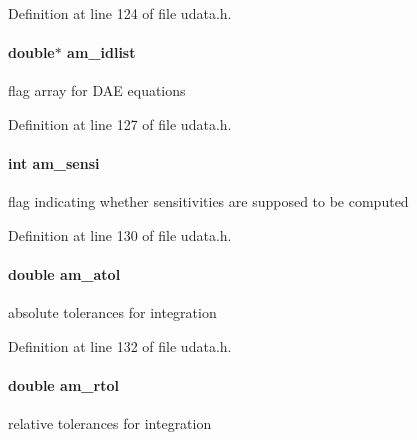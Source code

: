 Definition at line 124 of file udata.\+h.

\hypertarget{struct_user_data_ab62bd78b1593ddbf3d854356b4dcaa0f}{}
\paragraph[{am\+\_\+idlist}]{\setlength{\rightskip}{0pt plus 5cm}double$\ast$ am\+\_\+idlist}\label{struct_user_data_ab62bd78b1593ddbf3d854356b4dcaa0f}
flag array for D\+A\+E equations 

Definition at line 127 of file udata.\+h.

\hypertarget{struct_user_data_a3bd631d595b8a864de83f25a1756ce3d}{}
\paragraph[{am\+\_\+sensi}]{\setlength{\rightskip}{0pt plus 5cm}int am\+\_\+sensi}\label{struct_user_data_a3bd631d595b8a864de83f25a1756ce3d}
flag indicating whether sensitivities are supposed to be computed 

Definition at line 130 of file udata.\+h.

\hypertarget{struct_user_data_a2aade90998d7e2cefa7953d4fdbc438b}{}
\paragraph[{am\+\_\+atol}]{\setlength{\rightskip}{0pt plus 5cm}double am\+\_\+atol}\label{struct_user_data_a2aade90998d7e2cefa7953d4fdbc438b}
absolute tolerances for integration 

Definition at line 132 of file udata.\+h.

\hypertarget{struct_user_data_a2370b78f280747d84a69619ea8c55985}{}
\paragraph[{am\+\_\+rtol}]{\setlength{\rightskip}{0pt plus 5cm}double am\+\_\+rtol}\label{struct_user_data_a2370b78f280747d84a69619ea8c55985}
relative tolerances for integration 

